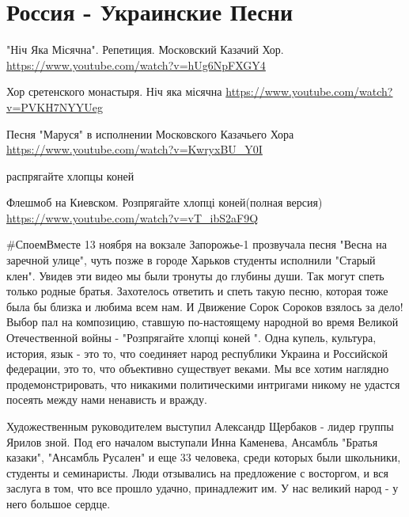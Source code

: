  
 
 
 
 
\section{Россия - Украинские Песни}
\label{sec:songs.rossia_poet_ukrainskie}

"Ніч Яка Місячна". Репетиция. Московский Казачий Хор.
\url{https://www.youtube.com/watch?v=hUg6NpFXGY4}

Хор сретенского монастыря. Ніч яка місячна
\url{https://www.youtube.com/watch?v=PVKH7NYYUeg}

Песня "Маруся" в исполнении Московского Казачьего Хора
\url{https://www.youtube.com/watch?v=KwryxBU_Y0I}


распрягайте хлопцы коней



Флешмоб на Киевском. Розпрягайте хлопці коней(полная версия)
\url{https://www.youtube.com/watch?v=vT_ibS2aF9Q}

#СпоемВместе
13 ноября на вокзале Запорожье-1 прозвучала песня "Весна на заречной улице", чуть позже в городе Харьков студенты исполнили "Старый клен". Увидев эти видео мы были тронуты до глубины души. Так могут спеть только родные братья. Захотелось ответить и спеть такую песню, которая тоже была бы близка и любима всем нам. И Движение Сорок Сороков взялось за дело! Выбор пал на композицию, ставшую по-настоящему народной во время Великой Отечественной войны - "Розпрягайте хлопці коней ".
Одна купель, культура, история, язык - это то, что соединяет народ республики Украина и Российской федерации, это то, что объективно существует веками. Мы все хотим наглядно продемонстрировать, что никакими политическими интригами никому не удастся посеять между нами ненависть и вражду.

Художественным руководителем выступил Александр Щербаков - лидер группы Ярилов зной. Под его началом выступали Инна Каменева, Ансамбль "Братья казаки", "Ансамбль Русален" и еще 33 человека, среди которых были школьники, студенты и семинаристы. Люди отзывались на предложение с восторгом, и вся заслуга в том, что все прошло удачно, принадлежит им. У нас великий народ - у него большое сердце.

